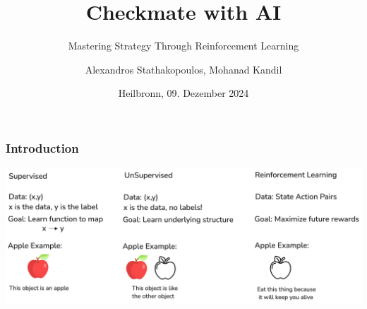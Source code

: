 %
% 
% 
%





\renewcommand{\PersonTitel}{}
\newcommand{\Datum}{\today}

\renewcommand{\PraesentationFusszeileZusatz}{}

\title{Checkmate with AI}
\subtitle{Mastering Strategy Through Reinforcement Learning}
\author{Alexandros Stathakopoulos, Mohanad Kandil}
\institute[]{\UniversitaetName}
\date[\Datum]{Heilbronn, 09. Dezember 2024}
\subject{}



\graphicspath{ {Ressourcen/_Bilder/} }
\PraesentationMasterStandard

\PraesentationTitelseite %

\begin{frame}
	\frametitle{Introduction}
	\vspace{1cm}
	\centering
	\includegraphics[scale=0.1]{appleNYC}
\end{frame}


